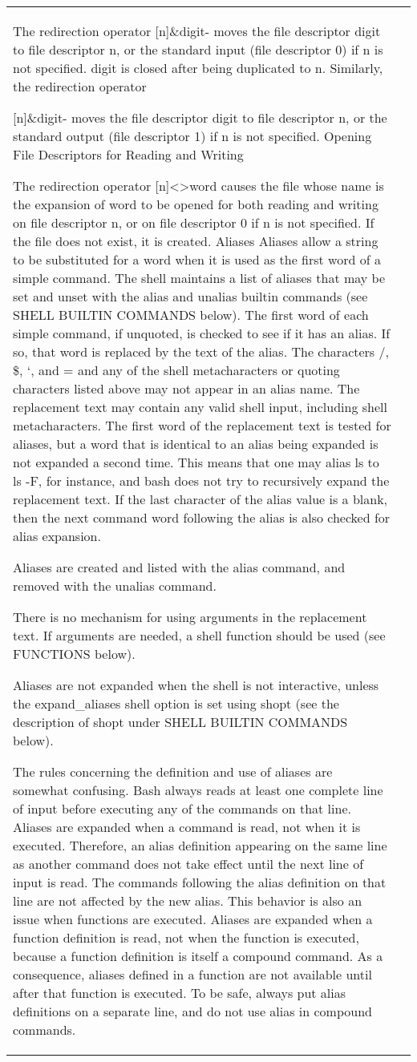 \documentclass[11pt]{article}
\begin{document}
\begin{longtable}{p{}p{}}
{{{The redirection operator
[n]\&digit-
moves the file descriptor digit to file descriptor n, or the standard input (file descriptor 0) if n is not specified. digit is closed after being duplicated to n.
Similarly, the redirection operator

[n]\&digit-
moves the file descriptor digit to file descriptor n, or the standard output (file descriptor 1) if n is not specified.
Opening File Descriptors for Reading and Writing

The redirection operator
[n]<>word
causes the file whose name is the expansion of word to be opened for both reading and writing on file descriptor n, or on file descriptor 0 if n is not specified. If the file does not exist, it is created.
Aliases
Aliases allow a string to be substituted for a word when it is used as the first word of a simple command. The shell maintains a list of aliases that may be set and unset with the alias and unalias builtin commands (see SHELL BUILTIN COMMANDS below). The first word of each simple command, if unquoted, is checked to see if it has an alias. If so, that word is replaced by the text of the alias. The characters /, \$, `, and = and any of the shell metacharacters or quoting characters listed above may not appear in an alias name. The replacement text may contain any valid shell input, including shell metacharacters. The first word of the replacement text is tested for aliases, but a word that is identical to an alias being expanded is not expanded a second time. This means that one may alias ls to ls -F, for instance, and bash does not try to recursively expand the replacement text. If the last character of the alias value is a blank, then the next command word following the alias is also checked for alias expansion.

Aliases are created and listed with the alias command, and removed with the unalias command.

There is no mechanism for using arguments in the replacement text. If arguments are needed, a shell function should be used (see FUNCTIONS below).

Aliases are not expanded when the shell is not interactive, unless the expand_aliases shell option is set using shopt (see the description of shopt under SHELL BUILTIN COMMANDS below).

The rules concerning the definition and use of aliases are somewhat confusing. Bash always reads at least one complete line of input before executing any of the commands on that line. Aliases are expanded when a command is read, not when it is executed. Therefore, an alias definition appearing on the same line as another command does not take effect until the next line of input is read. The commands following the alias definition on that line are not affected by the new alias. This behavior is also an issue when functions are executed. Aliases are expanded when a function definition is read, not when the function is executed, because a function definition is itself a compound command. As a consequence, aliases defined in a function are not available until after that function is executed. To be safe, always put alias definitions on a separate line, and do not use alias in compound commands.

}}}
\end{longtable}
\end{document}

